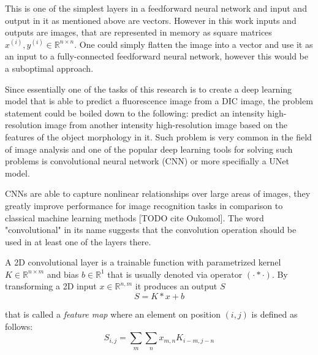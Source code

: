 This is one of the simplest layers in a feedforward neural network and input and output in it as mentioned above are vectors. However in this work inputs and outputs are images, that are represented in memory as square matrices $x^{(i)}, y^{(i)} \in \mathbb{R}^{n \times n}$. One could simply flatten the image into a vector and use it as an input to a fully-connected feedforward neural network, however this would be a suboptimal approach. 

Since essentially one of the tasks of this research is to create a deep learning model that is able to predict a fluorescence image from a DIC image, the problem statement could be boiled down to the following: predict an intensity high-resolution image from another intensity high-resolution image based on the features of the object morphology in it. Such problem is very common in the field of image analysis and one of the popular deep learning tools for solving such problems is convolutional neural network (CNN) or more specifially a UNet model.

CNNs are able to capture nonlinear relationships over large areas of images, they greatly improve performance for image recognition tasks in comparison to classical machine learning methods [TODO cite Oukomol]. The word "convolutional" in its name suggests that the convolution operation should be used in at least one of the layers there.  

\begin{definition}
	A 2D convolutional layer is a trainable function with parametrized kernel $K \in \mathbb{R}^{n \times m}$ and bias $b \in \mathbb{R}^{1}$ that is usually denoted via operator $(\cdot * \cdot)$. By transforming a 2D input $x \in \mathbb{R}^{n, m}$ it produces an output $S$
	\begin{equation}
		S = K * x + b
	\end{equation}

	that is called a \textit{feature map} where an element on position $(i, j)$ is defined as follows:
		\begin{equation}
			S_{i, j} = \sum_{m} \sum_{n} x_{m, n}  K_{i - m, j - n}
		\end{equation}
\end{definition}

